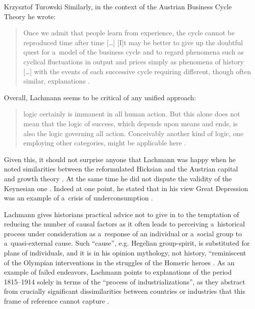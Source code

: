 \begin{artengenv}{Krzysztof Turowski}
Similarly, in the context of the Austrian Business Cycle Theory he wrote:
\begin{quote}
Once we admit that people learn from experience, the cycle cannot be reproduced time after time [\ldots]
[I]t may be better to give up the doubtful quest for a~model of the business cycle and to regard phenomena such as cyclical fluctuations in output and prices simply as phenomena of history [\ldots] with the events of each successive cycle requiring different, though often similar, explanations \parencite[30--31]{lachmann1986market}.
\end{quote}
Overall, Lachmann seems to be critical of any unified approach:
\begin{quote}
logic certainly is immanent in all human action. But this alone does not mean that the logic of success, which depends upon means and ends, is also the logic governing all action. Conceivably another kind of logic, one employing other categories, might be applicable here \parencite[59]{lachmann-significance}.
\end{quote}

Given this, it should not surprise anyone that Lachmann was happy when he noted similarities between the reformulated Hicksian and the Austrian capital and growth theory \parencite[253--254,258,264--265]{lachmann-hicks}. At the same time he did not dispute the validity of the Keynesian one \parencite[106]{lachmann-ha}. Indeed at one point, he stated that in his view Great Depression was an example of a~crisis of underconsumption \parencite[111]{lachmann-ha}.

Lachmann gives historians practical advice not to give in to the temptation of reducing the number of causal factors as it often leads to perceiving a~historical process under consideration as a~response of an individual or a~social group to a~quasi-external cause.
Such ``cause'', e.g. Hegelian group-spirit, is substituted for plans of individuals, and it is in his opinion mythology, not history, ``reminiscent of the Olympian interventions in the struggles of the Homeric heroes \parencite[175]{lachmann-science}.
As an example of failed endeavors, Lachmann points to explanations of the period 1815--1914 solely in terms of the ``process of industrializations'', as they abstract from crucially significant dissimilarities between countries or industries that this frame of reference cannot capture \parencite[176]{lachmann-science}.


\end{artengenv}
